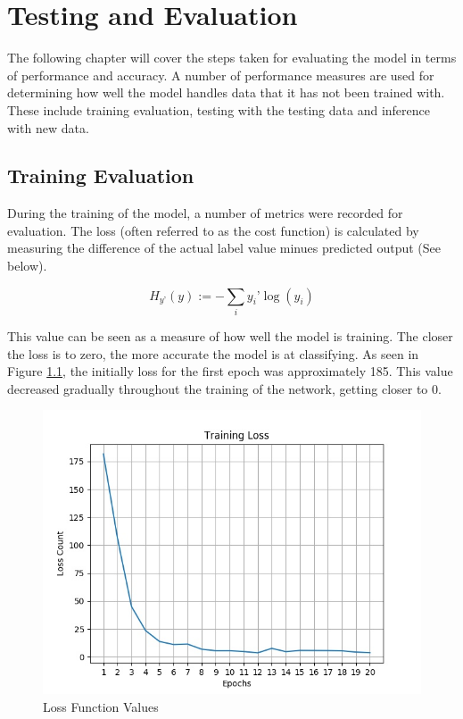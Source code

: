 \chapter{Testing and Evaluation}
The following chapter will cover the steps taken for evaluating the model in terms of performance and accuracy. A number of performance measures are used for determining how well the model handles data that it has not been trained with. These include training evaluation, testing with the testing data and inference with new data.

\section{Training Evaluation}
During the training of the model, a number of metrics were recorded for evaluation. The loss (often referred to as the cost function) is calculated by measuring the difference of the actual label value minues predicted output (See below).
 
\[H_{y’} (y) := - \sum_{i} y_{i}’ \log (y_i)\]

This value can be seen as a measure of how well the model is training. The closer the loss is to zero, the more accurate the model is at classifying. As seen in Figure \ref{loss}, the initially loss for the first epoch was approximately 185. This value decreased gradually throughout the training of the network, getting closer to 0.

\begin{figure}[ht]
	\begin{center}
		\advance\leftskip-3cm
		\advance\rightskip-3cm
		\includegraphics[keepaspectratio=true,scale=0.7]{__resources/Results/loss.jpg}
		\caption{Loss Function Values}
		\label{loss}
	\end{center}
\end{figure}

